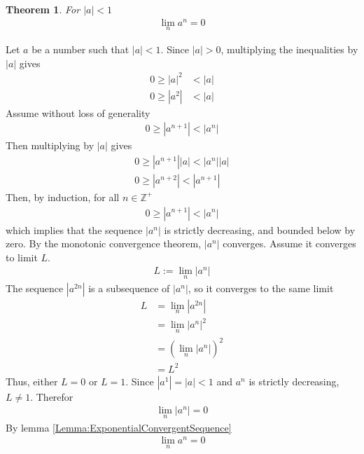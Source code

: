 \documentclass{amsart}
\numberwithin{equation}{section}
\let\oldendproof\endproof
\renewenvironment{proof}[1][\proofname]{%
  \setcounter{case}{0}
  \setcounter{step}{0}
  \oldproof[#1]%
}{\oldendproof}
\theoremstyle{plain}
\newtheorem{theorem}{Theorem}[section]
\theoremstyle{definition}
\theoremstyle{remark}
\begin{document}
\begin{theorem}
  For $|a|<1$
  \begin{align}
    \lim_n a^n = 0
  \end{align}
\end{theorem}
\begin{proof}
  Let $a$ be a number such that $|a| < 1$. Since $|a|>0$, multiplying the inequalities by $|a|$ gives
  \begin{align}
    0\geq|a|^2 &<|a|\\
    0\geq\left|a^2\right| &<|a|
  \end{align}
  Assume without loss of generality
  \begin{align}
    0\geq\left|a^{n+1}\right|< |a^n|
  \end{align}
  Then multiplying by $|a|$ gives
  \begin{align}
    0\geq\left|a^{n+1}\right||a|<\left|a^{n}\right||a|\\
    0\geq\left|a^{n+2}\right| < \left|a^{n+1}\right|
  \end{align}
  Then, by induction, for all $n\in\mathbb{Z}^+$
  \begin{align}
    0\geq\left|a^{n+1}\right| < \left|a^n\right|
  \end{align}
  which implies that the sequence $|a^n|$ is strictly decreasing, and bounded below by zero.
  By the monotonic convergence theorem, $|a^n|$ converges. Assume it converges to limit $L$.
  \begin{align}
    L:= \lim_n \left|a^n\right|
  \end{align}
  The sequence $\left|a^{2n}\right|$ is a subsequence of $\left|a^n\right|$, so it converges to the same limit
  \begin{align}
    L &= \lim_n \left|a^{2n}\right|\\
    &= \lim_n \left|a^n\right|^2\\
    &= \left(\lim_n \left|a^n\right|\right)^2\\
    &= L^2
  \end{align}
  Thus, either $L=0$ or $L=1$.
  Since $\left|a^1\right|=|a|<1$ and $a^n$ is strictly decreasing, $L \neq 1$. Therefor
  \begin{align}
    \lim_n |a^n| = 0
  \end{align}
  By lemma \ref{Lemma:ExponentialConvergentSequence}
  \begin{align}
    \lim_n a^n = 0
  \end{align}
\end{proof}
\end{document}
